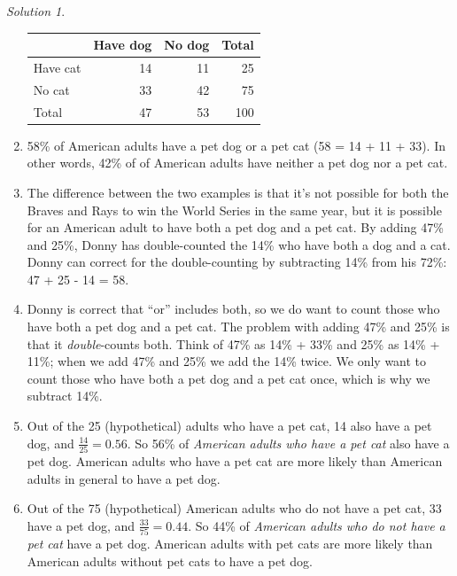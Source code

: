 \documentclass[
  letterpaper,
  DIV=11,
  numbers=noendperiod]{scrreprt}
\theoremstyle{plain}
\theoremstyle{definition}
\theoremstyle{definition}
\theoremstyle{definition}
\theoremstyle{remark}
\newtheorem{refsolution}{Solution}[chapter]
\begin{document}
\begin{tcolorbox}
\begin{refsolution}
\begin{enumerate}
  \begin{longtable}[]{@{}lrrr@{}}
  \toprule\noalign{}
  & Have dog & No dog & Total \\
  \midrule\noalign{}
  \endhead
  \bottomrule\noalign{}
  \endlastfoot
  Have cat & 14 & 11 & 25 \\
  No cat & 33 & 42 & 75 \\
  Total & 47 & 53 & 100 \\
  \end{longtable}
\item
  58\% of American adults have a pet dog or a pet cat (58 = 14 + 11 +
  33). In other words, 42\% of of American adults have neither a pet dog
  nor a pet cat.
\item
  The difference between the two examples is that it's not possible for
  both the Braves and Rays to win the World Series in the same year, but
  it is possible for an American adult to have both a pet dog and a pet
  cat. By adding 47\% and 25\%, Donny has double-counted the 14\% who
  have both a dog and a cat. Donny can correct for the double-counting
  by subtracting 14\% from his 72\%: 47 + 25 - 14 = 58.
\item
  Donny is correct that ``or'' includes both, so we do want to count
  those who have both a pet dog and a pet cat. The problem with adding
  47\% and 25\% is that it \emph{double}-counts both. Think of 47\% as
  14\% + 33\% and 25\% as 14\% + 11\%; when we add 47\% and 25\% we add
  the 14\% twice. We only want to count those who have both a pet dog
  and a pet cat once, which is why we subtract 14\%.
\item
  Out of the 25 (hypothetical) adults who have a pet cat, 14 also have a
  pet dog, and \(\frac{14}{25} = 0.56\). So 56\% of \emph{American
  adults who have a pet cat} also have a pet dog. American adults who
  have a pet cat are more likely than American adults in general to have
  a pet dog.
\item
  Out of the 75 (hypothetical) American adults who do not have a pet
  cat, 33 have a pet dog, and \(\frac{33}{75} = 0.44\). So 44\% of
  \emph{American adults who do not have a pet cat} have a pet dog.
  American adults with pet cats are more likely than American adults
  without pet cats to have a pet dog.
\end{enumerate}

\label{sol-cats-dogs}

\end{refsolution}

\end{tcolorbox}
\end{document}
